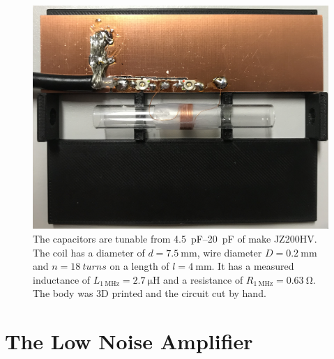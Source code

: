 \begin{figure}[hbt]
    \centering
    \includegraphics{images/probe.jpg}
    \caption{ The capacitors are tunable from \qtyrange{4.5}{20}{\pico\farad} of make JZ200HV. The coil has a diameter of \(d = \qty{7.5}{\milli\meter}\), wire diameter \(D = \qty{0.2}{\milli\meter}\) and \(n = \qty{18}{turns}\) on a length of \(l = \qty{4}{\milli\meter}\). It has a measured inductance of \(L_{\qty{1}{\mega\hertz}} = \qty{2.7}{\micro\henry}\) and a resistance of \(R_{\qty{1}{\mega\hertz}} = \qty{0.63}{\ohm}\). The body was 3D printed and the circuit cut by hand.}
\end{figure}

\section{The Low Noise Amplifier}


